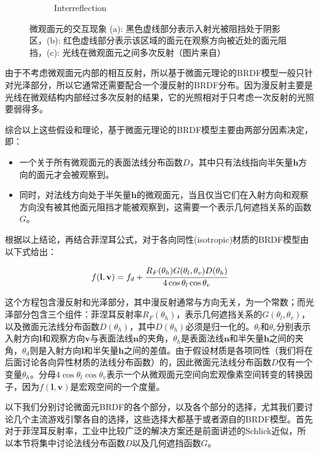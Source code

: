 \begin{figure}
\begin{subfigure}[b]{0.283\textwidth}
		\caption{Interreflection}
	\end{subfigure}
\caption{微观面元的交互现象 (a): 黑色虚线部分表示入射光被阻挡处于阴影区，(b): 红色虚线部分表示该区域的面元在观察方向被近处的面元阻挡，(c): 光线在微观面元之间多次反射（图片来自\cite{b:rtr}）}
\label{f:intro-microfacet-effect}
\end{figure}

由于不考虑微观面元内部的相互反射，所以基于微面元理论的BRDF模型一般只针对光泽部分，所以它通常还需要配合一个漫反射的BRDF分布。因为漫反射主要是光线在微观结构内部经过多次反射的结果，它的光照相对于只考虑一次反射的光照要弱得多。


综合以上这些假设和理论，基于微面元理论的BRDF模型主要由两部分因素决定，即：

\begin{itemize}
	\item 一个关于所有微观面元的表面法线分布函数$D$，其中只有法线指向半矢量$\mathbf{h}$方向的面元才会被观察到。
	\item 同时，对法线方向处于半矢量$\mathbf{h}$的微观面元，当且仅当它们在入射方向和观察方向没有被其他面元阻挡才能被观察到，这需要一个表示几何遮挡关系的函数$G$。
\end{itemize}

根据以上结论，再结合菲涅耳公式，对于各向同性(isotropic)材质的BRDF模型由以下式给出：

\begin{equation}
	f(\mathbf{l},\mathbf{v})=f_d+ \cfrac{R_F(\theta_h)G(\theta_l,\theta_v)D(\theta_h)}{4\cos\theta_l \cos\theta_v}
\end{equation}

\noindent 这个方程包含漫反射和光泽部分，其中漫反射通常与方向无关，为一个常数；而光泽部分包含三个组件：菲涅耳反射率$R_F(\theta_h)$，表示几何遮挡关系的$G(\theta_l,\theta_v)$，以及微面元法线分布函数$D(\theta_h)$，其中$D(\theta_h)$必须是归一化的。$\theta_l$和$\theta_v$分别表示入射方向$\mathbf{l}$和观察方向$\mathbf{v}$与表面法线$\mathbf{n}$的夹角，$\theta_h$是表面法线$\mathbf{n}$和半矢量$\mathbf{h}$之间的夹角，$\theta_d$则是入射方向$\mathbf{l}$和半矢量$\mathbf{h}$之间的差值。由于假设材质是各项同性（我们将在后面讨论各向异性材质的法线分布函数）的，因此微面元法线分布函数$D$仅有一个变量$\theta_h$。分母$4\cos\theta_l \cos\theta_v$表示一个从微观面元空间向宏观像素空间转变的转换因子，因为$f(\mathbf{l},\mathbf{v})$是宏观空间的一个度量。


以下我们分别讨论微面元BRDF的各个部分，以及各个部分的选择，尤其我们要讨论几个主流游戏引擎各自的选择，这些选择大都基于或者源自\cite{a:PhysicallyBasedShadingatDisney}的BRDF模型。首先对于菲涅耳反射率，工业中比较广泛的解决方案还是前面讲述的Schlick近似，所以本节将集中讨论法线分布函数$D$以及几何遮挡函数$G$。




